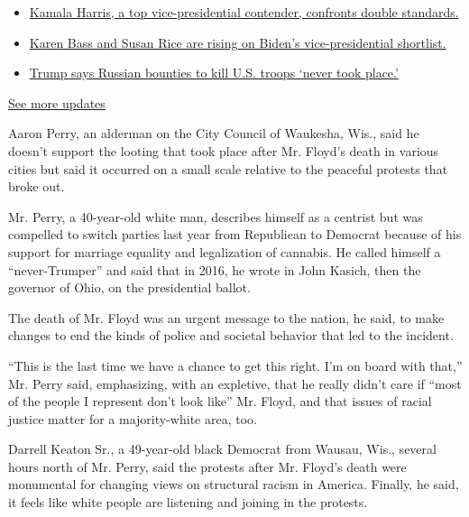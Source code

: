 \begin{itemize}
\tightlist
\item
  \href{https://www.nytimes.com/2020/07/31/us/elections/biden-vs-trump.html?action=click\&pgtype=Article\&state=default\&region=MAIN_CONTENT_1\&context=storylines_live_updates\#link-29fdff45}{Kamala
  Harris, a top vice-presidential contender, confronts double
  standards.}
\item
  \href{https://www.nytimes.com/2020/07/31/us/elections/biden-vs-trump.html?action=click\&pgtype=Article\&state=default\&region=MAIN_CONTENT_1\&context=storylines_live_updates\#link-13ec3d9c}{Karen
  Bass and Susan Rice are rising on Biden's vice-presidential
  shortlist.}
\item
  \href{https://www.nytimes.com/2020/07/31/us/elections/biden-vs-trump.html?action=click\&pgtype=Article\&state=default\&region=MAIN_CONTENT_1\&context=storylines_live_updates\#link-49e9a016}{Trump
  says Russian bounties to kill U.S. troops `never took place.'}
\end{itemize}

\href{https://www.nytimes.com/2020/07/31/us/elections/biden-vs-trump.html?action=click\&pgtype=Article\&state=default\&region=MAIN_CONTENT_1\&context=storylines_live_updates}{See
more updates}

Aaron Perry, an alderman on the City Council of Waukesha, Wis., said he
doesn't support the looting that took place after Mr. Floyd's death in
various cities but said it occurred on a small scale relative to the
peaceful protests that broke out.

Mr. Perry, a 40-year-old white man, describes himself as a centrist but
was compelled to switch parties last year from Republican to Democrat
because of his support for marriage equality and legalization of
cannabis. He called himself a ``never-Trumper'' and said that in 2016,
he wrote in John Kasich, then the governor of Ohio, on the presidential
ballot.

The death of Mr. Floyd was an urgent message to the nation, he said, to
make changes to end the kinds of police and societal behavior that led
to the incident.

``This is the last time we have a chance to get this right. I'm on board
with that,'' Mr. Perry said, emphasizing, with an expletive, that he
really didn't care if ``most of the people I represent don't look like''
Mr. Floyd, and that issues of racial justice matter for a majority-white
area, too.

Darrell Keaton Sr., a 49-year-old black Democrat from Wausau, Wis.,
several hours north of Mr. Perry, said the protests after Mr. Floyd's
death were monumental for changing views on structural racism in
America. Finally, he said, it feels like white people are listening and
joining in the protests.

